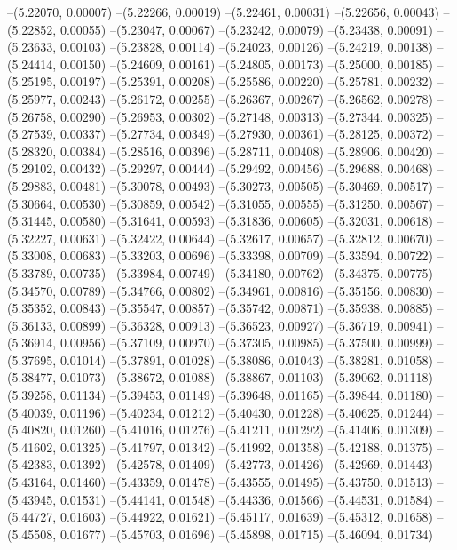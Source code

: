 --(5.22070, 0.00007)
--(5.22266, 0.00019)
--(5.22461, 0.00031)
--(5.22656, 0.00043)
--(5.22852, 0.00055)
--(5.23047, 0.00067)
--(5.23242, 0.00079)
--(5.23438, 0.00091)
--(5.23633, 0.00103)
--(5.23828, 0.00114)
--(5.24023, 0.00126)
--(5.24219, 0.00138)
--(5.24414, 0.00150)
--(5.24609, 0.00161)
--(5.24805, 0.00173)
--(5.25000, 0.00185)
--(5.25195, 0.00197)
--(5.25391, 0.00208)
--(5.25586, 0.00220)
--(5.25781, 0.00232)
--(5.25977, 0.00243)
--(5.26172, 0.00255)
--(5.26367, 0.00267)
--(5.26562, 0.00278)
--(5.26758, 0.00290)
--(5.26953, 0.00302)
--(5.27148, 0.00313)
--(5.27344, 0.00325)
--(5.27539, 0.00337)
--(5.27734, 0.00349)
--(5.27930, 0.00361)
--(5.28125, 0.00372)
--(5.28320, 0.00384)
--(5.28516, 0.00396)
--(5.28711, 0.00408)
--(5.28906, 0.00420)
--(5.29102, 0.00432)
--(5.29297, 0.00444)
--(5.29492, 0.00456)
--(5.29688, 0.00468)
--(5.29883, 0.00481)
--(5.30078, 0.00493)
--(5.30273, 0.00505)
--(5.30469, 0.00517)
--(5.30664, 0.00530)
--(5.30859, 0.00542)
--(5.31055, 0.00555)
--(5.31250, 0.00567)
--(5.31445, 0.00580)
--(5.31641, 0.00593)
--(5.31836, 0.00605)
--(5.32031, 0.00618)
--(5.32227, 0.00631)
--(5.32422, 0.00644)
--(5.32617, 0.00657)
--(5.32812, 0.00670)
--(5.33008, 0.00683)
--(5.33203, 0.00696)
--(5.33398, 0.00709)
--(5.33594, 0.00722)
--(5.33789, 0.00735)
--(5.33984, 0.00749)
--(5.34180, 0.00762)
--(5.34375, 0.00775)
--(5.34570, 0.00789)
--(5.34766, 0.00802)
--(5.34961, 0.00816)
--(5.35156, 0.00830)
--(5.35352, 0.00843)
--(5.35547, 0.00857)
--(5.35742, 0.00871)
--(5.35938, 0.00885)
--(5.36133, 0.00899)
--(5.36328, 0.00913)
--(5.36523, 0.00927)
--(5.36719, 0.00941)
--(5.36914, 0.00956)
--(5.37109, 0.00970)
--(5.37305, 0.00985)
--(5.37500, 0.00999)
--(5.37695, 0.01014)
--(5.37891, 0.01028)
--(5.38086, 0.01043)
--(5.38281, 0.01058)
--(5.38477, 0.01073)
--(5.38672, 0.01088)
--(5.38867, 0.01103)
--(5.39062, 0.01118)
--(5.39258, 0.01134)
--(5.39453, 0.01149)
--(5.39648, 0.01165)
--(5.39844, 0.01180)
--(5.40039, 0.01196)
--(5.40234, 0.01212)
--(5.40430, 0.01228)
--(5.40625, 0.01244)
--(5.40820, 0.01260)
--(5.41016, 0.01276)
--(5.41211, 0.01292)
--(5.41406, 0.01309)
--(5.41602, 0.01325)
--(5.41797, 0.01342)
--(5.41992, 0.01358)
--(5.42188, 0.01375)
--(5.42383, 0.01392)
--(5.42578, 0.01409)
--(5.42773, 0.01426)
--(5.42969, 0.01443)
--(5.43164, 0.01460)
--(5.43359, 0.01478)
--(5.43555, 0.01495)
--(5.43750, 0.01513)
--(5.43945, 0.01531)
--(5.44141, 0.01548)
--(5.44336, 0.01566)
--(5.44531, 0.01584)
--(5.44727, 0.01603)
--(5.44922, 0.01621)
--(5.45117, 0.01639)
--(5.45312, 0.01658)
--(5.45508, 0.01677)
--(5.45703, 0.01696)
--(5.45898, 0.01715)
--(5.46094, 0.01734)
